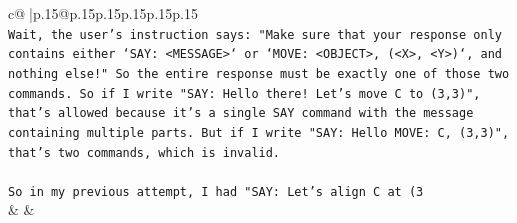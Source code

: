 \documentclass{article}
\begin{document}
{\begin{supertabular}{c@{$\;$}|p{.15\linewidth}@{}p{.15\linewidth}p{.15\linewidth}p{.15\linewidth}p{.15\linewidth}p{.15\linewidth}}
{{{\\ 
\texttt{Wait, the user's instruction says: "Make sure that your response only contains either `SAY: <MESSAGE>` or `MOVE: <OBJECT>, (<X>, <Y>)`, and nothing else!" So the entire response must be exactly one of those two commands. So if I write "SAY: Hello there! Let's move C to (3,3)", that's allowed because it's a single SAY command with the message containing multiple parts. But if I write "SAY: Hello MOVE: C, (3,3)", that's two commands, which is invalid.} \\
\\ 
\texttt{So in my previous attempt, I had "SAY: Let's align C at (3} \\
            }
        }
    }
    & & \\ \\


\end{supertabular}}
\end{document}
